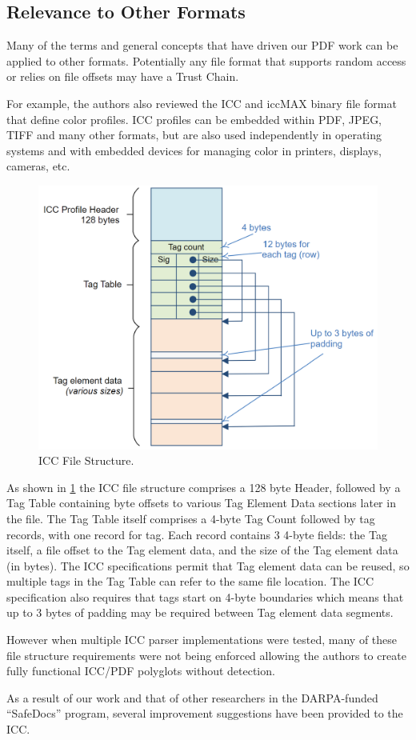 \subsection{Relevance to Other Formats}
\label{sec:other-formats}

Many of the terms and general concepts that have driven our PDF work
can be applied to other formats. Potentially any file format that supports random access or relies on file offsets may have a Trust Chain.

For example, the authors also reviewed the ICC \cite{isotc130jwg7ISO15076120102010} and 
iccMAX \cite{iccSpecificationICC20192019} binary file format that define color profiles.
ICC profiles can be embedded within PDF, JPEG, TIFF and many other formats, but are also 
used independently in operating systems and with embedded devices for managing color in 
printers, displays, cameras, etc.

\begin{figure}[t]
    \centering
    \includegraphics[width=0.85\linewidth]{figures/icc.png}
    \caption{ICC File Structure.}
    \label{fig:icc-structure}
\end{figure}

As shown in \cref{fig:icc-structure} the ICC file structure comprises a 128 byte Header, followed by a 
Tag Table containing byte offsets to various Tag Element Data sections later in the file. 
The Tag Table itself comprises a 4-byte Tag Count followed by tag records, with one record for tag. 
Each record contains 3 4-byte fields: the Tag itself, a file offset to the Tag element data, and the size of the Tag element data (in bytes).
The ICC specifications permit that Tag element data can be reused, so multiple tags in the Tag Table can
refer to the same file location. The ICC specification also requires that tags start on 4-byte boundaries
which means that up to 3 bytes of padding may be required between Tag element data segments.

However when multiple ICC parser implementations were tested, many of these file structure requirements
were not being enforced allowing the authors to create fully functional ICC/PDF polyglots 
without detection.

As a result of our work and that of other researchers in the DARPA-funded ``SafeDocs'' program, several
improvement suggestions have been provided to the ICC.
